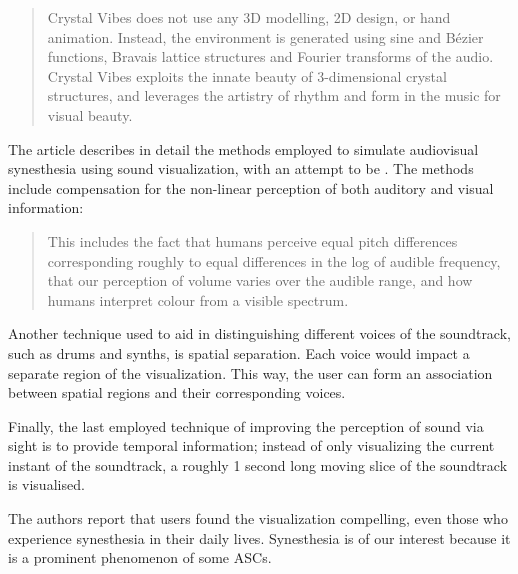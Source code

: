 \begin{quote}
    Crystal Vibes does not use any 3D modelling, 2D design, or hand animation. Instead, the environment is generated using sine and Bézier functions, Bravais lattice structures and Fourier transforms of the audio. Crystal Vibes exploits the innate beauty of 3-dimensional crystal structures, and leverages the artistry of rhythm and form in the music for visual beauty.
\end{quote}

The article describes in detail the methods employed to simulate audiovisual synesthesia using sound visualization, with an attempt to be . The methods include compensation for the non-linear perception of both auditory and visual information:

\begin{quote}
    This includes the fact that humans perceive equal pitch differences corresponding roughly to equal differences in the log of audible frequency, that our perception of volume varies over the audible range, and how humans interpret colour from a visible spectrum.
\end{quote}

Another technique used to aid in distinguishing different voices of the soundtrack, such as drums and synths, is spatial separation. Each voice would impact a separate region of the visualization. This way, the user can form an association between spatial regions and their corresponding voices.

Finally, the last employed technique of improving the perception of sound via sight is to provide temporal information; instead of only visualizing the current instant of the soundtrack, a roughly 1 second long moving slice of the soundtrack is visualised.

The authors report that users found the visualization compelling, even those who experience synesthesia in their daily lives. Synesthesia is of our interest because it is a prominent phenomenon of some \acp{ASC}.

